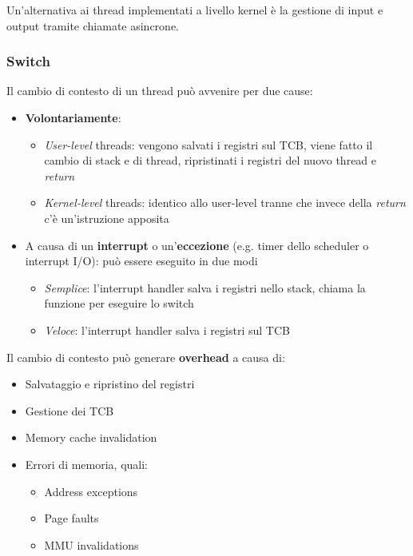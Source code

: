 \begin{observation}[Asynchronous I/O]
	Un'alternativa ai thread implementati a livello kernel è la gestione di input e output tramite chiamate asincrone.
\end{observation}

\subsubsection{Switch}
Il cambio di contesto di un thread può avvenire per due cause:
\begin{itemize}
	\item \textbf{Volontariamente}:
	\begin{itemize}
		\item \textit{User-level} threads: vengono salvati i registri sul TCB, viene fatto il cambio di stack e  di thread, ripristinati i registri del nuovo thread e \textit{return}
		\item \textit{Kernel-level} threads: identico allo user-level tranne che invece della \textit{return} c'è un'istruzione apposita
	\end{itemize}
	\item A causa di un \textbf{interrupt} o un'\textbf{eccezione} (e.g. timer dello scheduler o interrupt I/O): può essere eseguito in due modi
	\begin{itemize}
		\item \textit{Semplice}: l'interrupt handler salva i registri nello stack, chiama la funzione per eseguire lo switch 
		\item \textit{Veloce}: l'interrupt handler salva i registri sul TCB
	\end{itemize}
\end{itemize}
Il cambio di contesto può generare \textbf{overhead} a causa di:
\begin{itemize}
	\item Salvataggio e ripristino del registri
	\item Gestione dei TCB
	\item Memory cache invalidation
	\item Errori di memoria, quali:
	\begin{itemize}
		\item Address exceptions
		\item Page faults
		\item MMU invalidations
	\end{itemize}
\end{itemize}

